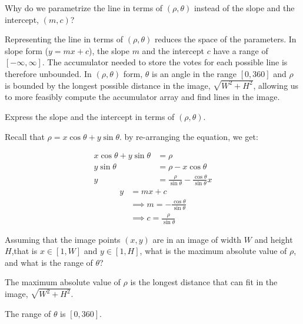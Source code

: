 \begin{problem}
  Why do we parametrize the line in terms of $(\rho, \theta)$
  instead of the slope and the intercept, $(m, c)$?
  \begin{Answer}
    Representing the line in terms of $(\rho, \theta)$
    reduces the space of the parameters.
    In slope form ($y = mx + c$), the slope $m$ and the intercept $c$
    have a range of $[-\infty, \infty]$.
    The accumulator needed to store the votes for each possible
    line is therefore unbounded.
    In $(\rho, \theta)$ form, $\theta$ is an angle in the range
    $[0, 360]$ and $\rho$ is bounded by the longest possible distance
    in the image, $\sqrt{W^2 + H^2}$, allowing us to more feasibly
    compute the accumulator array and find lines in the image.
  \end{Answer}

  \step
  Express the slope and the intercept in terms of $(\rho, \theta)$.
  \begin{Answer}
    Recall that $\rho = x \cos \theta + y \sin \theta$.
    by re-arranging the equation, we get:
    \begin{multicols}{2}
      \noindent
      \begin{align*}
        x \cos \theta + y \sin \theta &= \rho \\
        y \sin \theta &= \rho - x \cos \theta \\
        y &= \frac{\rho}{\sin \theta} - \frac{\cos \theta}{\sin \theta}x
      \end{align*}
      \begin{align*}
        y &= mx + c \\
        &\implies m = - \frac{\cos \theta}{\sin \theta} \\
        &\implies c = \frac{\rho}{\sin \theta}
      \end{align*}
    \end{multicols}
  \end{Answer}
\end{problem}

\begin{problem}
  Assuming that the image points $(x, y)$ are in an image
  of width $W$ and height $H$,that is $x \in [1, W]$ and $y \in [1, H]$,
  what is the maximum absolute value of $\rho$,
  and what is the range of $\theta$?
  \begin{Answer}
    The maximum absolute value of $\rho$ is the longest distance
    that can fit in the image, $\sqrt{W^2 + H^2}$.

    \step
    The range of $\theta$ is $[0, 360]$.
  \end{Answer}
\end{problem}

